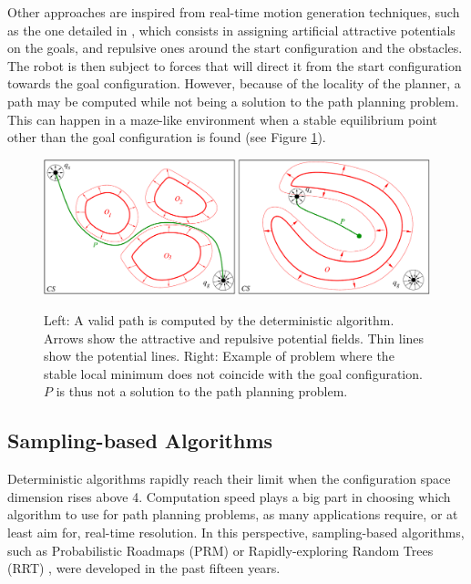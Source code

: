 Other approaches are inspired from real-time motion generation
techniques, such as the one detailed in \cite{khat85}, which consists
in assigning artificial attractive potentials on the goals, and
repulsive ones around the start configuration and the obstacles. The
robot is then subject to forces that will direct it from the start
configuration towards the goal configuration. However, because of the
locality of the planner, a path may be computed while not being a
solution to the path planning problem. This can happen in a maze-like
environment when a stable equilibrium point other than the goal
configuration is found (see Figure
\ref{fig:chap1-deterministic-algorithm}).

\begin{figure}
  \centering
      {\includegraphics[width = \linewidth]
        {src/chap1-path-optimization/deterministic-algorithm.pdf}}
      \caption{Left: A valid path is computed by the deterministic
        algorithm. Arrows show the attractive and repulsive potential
        fields. Thin lines show the potential lines. Right: Example of
        problem where the stable local minimum does not coincide with
        the goal configuration. $P$ is thus not a solution to the path
        planning problem.}
      \label{fig:chap1-deterministic-algorithm}
\end{figure}

\subsection{Sampling-based Algorithms}
\label{subsec:chap1-sampling-algorithms}

Deterministic algorithms rapidly reach their limit when the
configuration space dimension rises above 4. Computation speed plays a
big part in choosing which algorithm to use for path planning
problems, as many applications require, or at least aim for, real-time
resolution. In this perspective, sampling-based algorithms, such as
Probabilistic Roadmaps (PRM) \cite{kavr96} or Rapidly-exploring Random
Trees (RRT) \cite{kuff00}, were developed in the past fifteen years.

